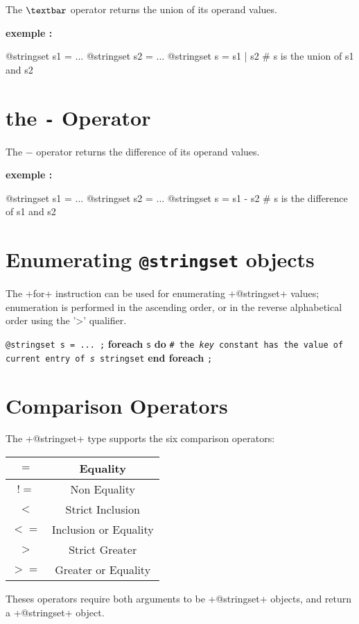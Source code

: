 The \emph{$\textbar$} operator returns the union of its operand values.

\textbf{exemple :}
\begin{galgas}
@stringset s1 = ...
@stringset s2 = ...
@stringset s = s1 | s2 # s is the union of s1 and s2
\end{galgas}






\section{the \texttt{-} Operator}

The \emph{$-$} operator returns the difference of its operand values.

\textbf{exemple :}
\begin{galgas}
@stringset s1 = ...
@stringset s2 = ...
@stringset s = s1 - s2 # s is the difference of s1 and s2
\end{galgas}








\section{Enumerating \texttt{@stringset} objects}


The \ggs+for+ instruction can be used for enumerating \ggs+@stringset+ values; enumeration is performed in the ascending order, or in the reverse alphabetical order using the '>' qualifier.

\texttt{@stringset s = ... ;}\newline
\textbf{foreach} \texttt {s} \textbf {do}\newline
\texttt{\# the \emph{key} constant has the value of current entry of \emph{s} stringset}\newline
\textbf{end foreach} \texttt{;}







\section{Comparison Operators}

The \ggs+@stringset+ type supports the six comparison operators:\newline

\begin{tabular}{|c|c|}
\hline
$=$ & Equality \\
\hline
$!=$ & Non Equality \\
\hline
$<$  & Strict Inclusion \\
\hline
$<=$  & Inclusion or Equality \\
\hline
$>$  & Strict Greater \\
\hline
$>=$  & Greater or Equality \\
\hline
\end{tabular}

Theses operators require both arguments to be \ggs+@stringset+ objects, and return a \ggs+@stringset+ object.


